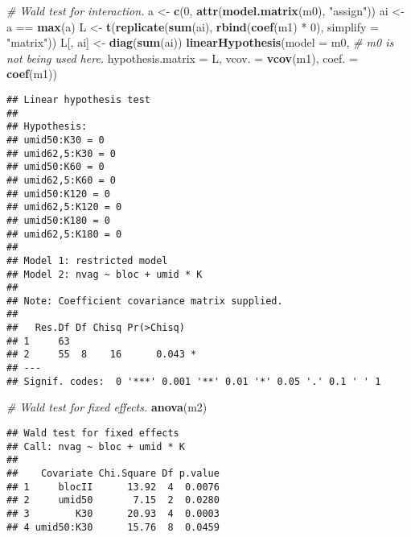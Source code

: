 \documentclass[9pt,a5paper,]{book}
\newenvironment{Shaded}{}{}
\newcommand{\KeywordTok}[1]{\textbf{{#1}}}
\newcommand{\DataTypeTok}[1]{\underline{{#1}}}
\newcommand{\DecValTok}[1]{{#1}}
\newcommand{\StringTok}[1]{{#1}}
\newcommand{\CommentTok}[1]{\textit{{#1}}}
\newcommand{\NormalTok}[1]{{#1}}
\renewenvironment{Shaded}{\color{inputcolor}}{}
\renewcommand{\DataTypeTok}[1]{{#1}}
\theoremstyle{definition}
\theoremstyle{definition}
\theoremstyle{remark}
\begin{document}
\begin{Shaded}
\begin{Highlighting}[]
\CommentTok{# Wald test for interaction.}
\NormalTok{a <-}\StringTok{ }\KeywordTok{c}\NormalTok{(}\DecValTok{0}\NormalTok{, }\KeywordTok{attr}\NormalTok{(}\KeywordTok{model.matrix}\NormalTok{(m0), }\StringTok{"assign"}\NormalTok{))}
\NormalTok{ai <-}\StringTok{ }\NormalTok{a ==}\StringTok{ }\KeywordTok{max}\NormalTok{(a)}
\NormalTok{L <-}\StringTok{ }\KeywordTok{t}\NormalTok{(}\KeywordTok{replicate}\NormalTok{(}\KeywordTok{sum}\NormalTok{(ai), }\KeywordTok{rbind}\NormalTok{(}\KeywordTok{coef}\NormalTok{(m1) *}\StringTok{ }\DecValTok{0}\NormalTok{), }\DataTypeTok{simplify =} \StringTok{"matrix"}\NormalTok{))}
\NormalTok{L[, ai] <-}\StringTok{ }\KeywordTok{diag}\NormalTok{(}\KeywordTok{sum}\NormalTok{(ai))}
\KeywordTok{linearHypothesis}\NormalTok{(}\DataTypeTok{model =} \NormalTok{m0, }\CommentTok{# m0 is not being used here.}
                 \DataTypeTok{hypothesis.matrix =} \NormalTok{L,}
                 \DataTypeTok{vcov. =} \KeywordTok{vcov}\NormalTok{(m1),}
                 \DataTypeTok{coef. =} \KeywordTok{coef}\NormalTok{(m1))}
\end{Highlighting}
\end{Shaded}

\begin{verbatim}
## Linear hypothesis test
## 
## Hypothesis:
## umid50:K30 = 0
## umid62,5:K30 = 0
## umid50:K60 = 0
## umid62,5:K60 = 0
## umid50:K120 = 0
## umid62,5:K120 = 0
## umid50:K180 = 0
## umid62,5:K180 = 0
## 
## Model 1: restricted model
## Model 2: nvag ~ bloc + umid * K
## 
## Note: Coefficient covariance matrix supplied.
## 
##   Res.Df Df Chisq Pr(>Chisq)  
## 1     63                      
## 2     55  8    16      0.043 *
## ---
## Signif. codes:  0 '***' 0.001 '**' 0.01 '*' 0.05 '.' 0.1 ' ' 1
\end{verbatim}

\begin{Shaded}
\begin{Highlighting}[]
\CommentTok{# Wald test for fixed effects.}
\KeywordTok{anova}\NormalTok{(m2)}
\end{Highlighting}
\end{Shaded}

\begin{verbatim}
## Wald test for fixed effects
## Call: nvag ~ bloc + umid * K
## 
##    Covariate Chi.Square Df p.value
## 1     blocII      13.92  4  0.0076
## 2     umid50       7.15  2  0.0280
## 3        K30      20.93  4  0.0003
## 4 umid50:K30      15.76  8  0.0459
\end{verbatim}
\end{document}
